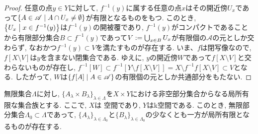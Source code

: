 \documentclass[uplatex, dvipdfmx, a4paper, 12pt, class=jsbook, crop=false]{standalone}
\begin{document}
\begin{proof}
	任意の点$ y \in Y $に対して, $ f^{-1}(y) $に属する任意の点$ x $はその開近傍$ U_x $であって$ \setcomp{A \in \mathscr{A}}{A \cap U_x \neq \emptyset} $が有限となるものをもつ. このとき, $ \setcomp{U_x}{x \in f^{-1}(y)} $は$ f^{-1}(y) $の開被覆であり, $ f^{-1}(y) $がコンパクトであることから有限部分集合$ B \subset f^{-1}(y) $であって$ V \mathrel{:=} \bigcup_{x \in B} U_x $が有限個の$ \mathscr{A} $の元としか交わらず, なおかつ$ f^{-1}(y) \subset V $を満たすものが存在する. いま、$ f $は閉写像なので, $ f[X \setminus V] $は$ y $を含まない閉集合である. ゆえに, $ y $の開近傍$ W $であって$ f[X \setminus V] $と交わらないものが存在し, $ f^{-1}[W] \subset f^{-1}[Y \setminus f[X \setminus V]] = X \setminus f^{-1}f[X \setminus V] \subset V $となる. したがって, $ W $は$ \setcomp{f[A]}{A \in \mathscr{A}} $の有限個の元としか共通部分をもたない.

\end{proof}

\begin{lemma}
	\label{lemma:Lemma for the proof that every product of pseudocompact space X and pseudocompact k space is also pseudocompact in a class of T3.5 space}
	無限集合$ \Lambda $に対し, $ \{A_\lambda \times B_\lambda\}_{\lambda \in \Lambda} $を$ X \times Y $における非空部分集合からなる局所有限な集合族とする. ここで, $ X $は \Hausdorff 空間であり, $ Y $はk空間である. このとき, 無限部分集合$ \Lambda_0 \subset \Lambda $であって, $ \{A_\lambda\}_{\lambda \in \Lambda_0} $と$ \{B_\lambda\}_{\lambda \in \Lambda_0} $の少なくとも一方が局所有限となるものが存在する.
\end{lemma}
\end{document}
